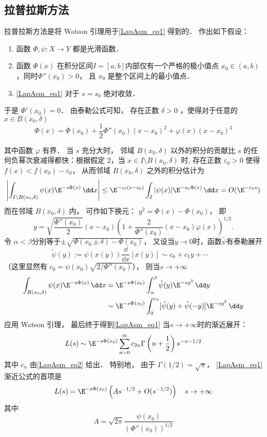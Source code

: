 \subsection{拉普拉斯方法}
拉普拉斯方法是将 Watson 引理用于\autoref{LapAsm_eq1} 得到的． 作出如下假设：

\begin{enumerate}
\item 函数 $\Phi,\psi:X\to Y$ 都是光滑函数．

\item 函数 $\Phi(x)$ 在积分区间$I=[a,b]$内部仅有一个严格的极小值点 $x_0\in(a,b)$，同时$\Phi''(x_0)>0$， 且 $x_0$ 是整个区间上的最小值点．

\item \autoref{LapAsm_eq1} 对于 $s=s_0$ 绝对收敛．
\end{enumerate}

于是 $\Phi'(x_0)=0$． 由泰勒公式可知， 存在正数 $\delta>0$ ，使得对于任意的 $x\in B(x_0,\delta)$  
\[
  \Phi(x)=\Phi(x_0)+\frac{1}{2}\Phi''(x_0)(x-x_0)^2+\varphi(x)(x-x_0)^3
\]

其中函数 $\varphi$ 有界． 当 $s$ 充分大时， 邻域 $B(x_0,\delta)$ 以外的积分的贡献比 $s$ 的任何负幂次衰减得都快：根据假定 2，当 $x\in I\setminus B(x_0,\delta)$ 时, 存在正数 $\varepsilon_0>0$ 使得 $f(x)<f(x_0)-\varepsilon_0$， 从而邻域 $B(x_0,\delta)$ 之外的积分估计为
\[
  \left|\int_{I\setminus B(x_0,\delta)}\psi(x)\E^{-s\Phi(x)}\,\dd x\right|
  \leq \E^{-\epsilon_0(s-s_0)}\int_I|\psi(x)|\E^{-s_0\Phi(x)}\,\dd x
  =O(\E^{-\varepsilon_0s})
\]
而在邻域 $B(x_0,\delta)$ 内， 可作如下换元： $y^2=\Phi(x)-\Phi(x_0)$， 即
\[
  y=\sqrt{\frac{\Phi''(x_0)}{2}}(x-x_0)\left(1+\frac{2}{\Phi''(x_0)}(x-x_0)\varphi(x)\right)^{1/2}.
\]
令 $\alpha<\beta$分别等于$\pm\sqrt{\Phi(x_0\pm\delta)-\Phi(x_0)}$， 又设当$y\to0$时，函数$\tilde{\psi}$有泰勒展开
\begin{equation}\label{LapAsm_eq2}
\tilde{\psi}(y):=\psi(x(y))\frac{\dd}{\dd x}[x(y)]\sim c_0+c_1y+\cdots \quad 
\end{equation}
（这里显然有 $c_0=\psi(x_0)\sqrt{2/\Phi''(x_0)}$）， 则当$s\to+\infty$
$$
\begin{aligned}
\int_{B(x_0,\delta)}\psi(x)\E^{-s\Phi(x)}\,\dd x
&=\E^{-s\Phi(x_0)}\int_{\alpha}^{\beta}\tilde \psi(y)\E^{-sy^2}\,\dd y\\
&\sim\E^{-s\Phi(x_0)}\int_{0}^{\varepsilon_0}[\tilde \psi(y)+\tilde \psi(-y)]\E^{-sy^2}\,\dd y
\end{aligned}
$$
应用 Watson 引理， 最后终于得到\autoref{LapAsm_eq1} 当$s\to+\infty$时的渐近展开：
\begin{equation}\label{LapAsm_eq3}
  L(s)\sim \E^{-s\Phi(x_0)}\sum_{n=0}^\infty c_{2n}\Gamma\left(n+\frac{1}{2}\right)s^{-n-1/2}
\end{equation}
其中 $c_n$ 由\autoref{LapAsm_eq2} 给出． 特别地， 由于 $\Gamma(1/2)=\sqrt{\pi}$， \autoref{LapAsm_eq1} 渐近公式的首项是
\[
L(s)=\E^{-s\Phi(x_0)}\left(As^{-1/2}+O(s^{-1/2})\right)\quad s\to+\infty
\]
其中
\[
  A=\sqrt{2\pi}\frac{\psi(x_0)}{(\Phi''(x_0))^{1/2}}
\]

